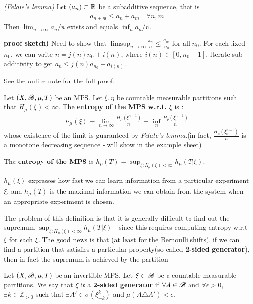 \documentclass[12pt,a4paper]{report}
\newenvironment{proof}
{\begin{changemargin}{1cm}{0.5cm} 
	}%
	{\end{changemargin}
}
\begin{document}
\lem \emph{(Felate's lemma)} Let $(a_n)\subset \mathbb{R}$ be a subadditive sequence, that is
\begin{align*}
a_{n+m} \leq a_n + a_m \quad \forall n,m
\end{align*}
Then $\lim_{n\rightarrow \infty} a_n/n$ exists and equals $\inf_{n} a_n /n $.
\begin{proof}
\textbf{proof sketch)} Need to show that $\limsup_{n\rightarrow \infty} \frac{a_n}{n} \leq \frac{a_{n_0}}{n_0}$ for all $n_0$. For each fixed $n_0$, we can write $n = j(n)n_0 + i(n)$, where $i(n) \in [0,n_0-1]$. Iterate sub-additivity to get $a_n \leq j(n) a_{n_0} + a_{i(n)}$.

\quad See the online note for the full proof.
\end{proof}
\s

 Let $(X,\mathscr{B}, \mu, T)$ be an MPS. Let $\xi, \eta$ be countable measurable partitions such that $H_{\mu}(\xi) < \infty$. The \textbf{entropy of the MPS w.r.t. $\xi$} is :
\begin{align*}
h_{\mu} (\xi) = \lim_{n\rightarrow \infty} \frac{H_{\mu}(\xi_0^{n-1})}{n} = \inf_n \frac{H_{\mu}(\xi_0^{n-1})}{n}
\end{align*}
whose existence of the limit is guaranteed by \emph{Felate's lemma}.(in fact, $\frac{H_{\mu}(\xi_0^{n-1})}{n}$ is a monotone decreasing sequence - will show in the example sheet)

\quad The \textbf{entropy of the MPS} is $h_{\mu}(T) = \sup_{\xi : H_{\mu}(\xi)<\infty} h_{\mu}(T|\xi)$.
\s

$h_{\mu} (\xi)$ expresses how fast we can learn information from a particular experiment $\xi$, and $h_{\mu}(T)$ is the maximal information we can obtain from the system when an appropriate experiment is chosen.
\s

The problem of this definition is that it is generally difficult to find out the supremum $\sup_{\xi : H_{\mu}(\xi)<\infty} h_{\mu}(T|\xi)$ - since this requires computing entropy w.r.t $\xi$ for each $\xi$. The good news is that (at least for the Bernoulli shifts), if we can find a partition that satisfies a particular property(so called \textbf{2-sided generator}), then in fact the supremum is achieved by the partition.
\s

 Let $(X,\mathscr{B}, \mu, T)$ be an invertible MPS. Let $\xi \subset \mathscr{B}$ be a countable measurable partitions. We say that $\xi$ is a \textbf{2-sided generator} if $\forall A\in \mathscr{B}$ and $\forall \epsilon >0$, $\exists k\in \mathbb{Z}_{>0}$ such that $\exists A'\in \sigma( \xi^k_{-k} )$ and $\mu(A \triangle A') <\epsilon$.
\s
\end{document}

